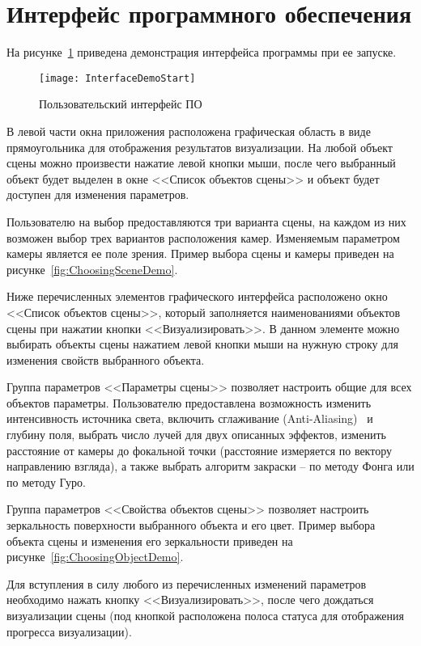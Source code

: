 \clearpage
\section{Интерфейс программного обеспечения}
На рисунке~\ref{fig:InterfaceDemoStart} приведена демонстрация интерфейса программы при ее запуске.
\begin{figure}[H]
	\centering
	\texttt{[image: InterfaceDemoStart]}
	\caption{Пользовательский интерфейс ПО}
	\label{fig:InterfaceDemoStart}
\end{figure}

В левой части окна приложения расположена графическая область в виде прямоугольника для отображения результатов визуализации. На любой объект сцены можно произвести нажатие левой кнопки мыши, после чего выбранный объект будет выделен в окне <<Список объектов сцены>> и объект будет доступен для изменения параметров.

Пользователю на выбор предоставляются три варианта сцены, на каждом из них возможен выбор трех вариантов расположения камер. Изменяемым параметром камеры является ее поле зрения. Пример выбора сцены и камеры приведен на рисунке~\ref{fig:ChoosingSceneDemo}.

Ниже перечисленных элементов графического интерфейса расположено окно <<Список объектов сцены>>, который заполняется наименованиями объектов сцены при нажатии кнопки <<Визуализировать>>. В данном элементе можно выбирать объекты сцены нажатием левой кнопки мыши на нужную строку для изменения свойств выбранного объекта.

Группа параметров <<Параметры сцены>> позволяет настроить общие для всех объектов параметры. Пользователю предоставлена возможность изменить интенсивность источника света, включить сглаживание (Anti-Aliasing)~\cite{Anti-aliasing} и глубину поля, выбрать число лучей для двух описанных эффектов, изменить расстояние от камеры до фокальной точки (расстояние измеряется по вектору направлению взгляда), а также выбрать алгоритм закраски -- по методу Фонга или по методу Гуро.

Группа параметров <<Свойства объектов сцены>> позволяет настроить зеркальность поверхности выбранного объекта и его цвет. Пример выбора объекта сцены и изменения его зеркальности приведен на рисунке~\ref{fig:ChoosingObjectDemo}.

Для вступления в силу любого из перечисленных изменений параметров необходимо нажать кнопку <<Визуализировать>>, после чего дождаться визуализации сцены (под кнопкой расположена полоса статуса для отображения прогресса визуализации).

